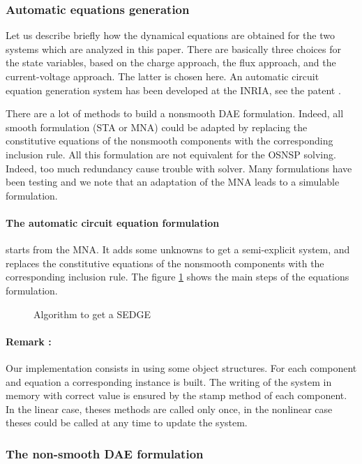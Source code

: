 \documentclass{article}
\begin{document}
\subsubsection{Automatic equations generation}

Let us describe briefly how the dynamical equations are obtained for the two systems which are analyzed in this paper. There are basically three choices for the state variables, based on the charge approach, the flux approach, and the current-voltage approach. The latter is chosen here. An automatic circuit equation generation system has been developed at the INRIA, see the patent \cite{}. 

There are a lot of methods to build a nonsmooth DAE formulation. Indeed, all smooth formulation 
(STA or MNA) could be adapted by replacing the constitutive equations of the nonsmooth components
with the corresponding inclusion rule. All this formulation are not equivalent for the OSNSP
solving. Indeed, too much redundancy cause trouble with solver. Many formulations have been testing
and we note that an adaptation of the MNA leads to a simulable formulation.

\paragraph{The automatic circuit equation formulation} starts from the MNA. It adds some unknowns to
get a semi-explicit system, and replaces the constitutive equations of the nonsmooth components with
the corresponding inclusion rule. The figure \ref{fig:acef_algo} shows the main steps of the
equations formulation.

\begin{figure}[h]
  \centering
  \scalebox{0.5}{
  
  }
  \caption{Algorithm to get a SEDGE}
  \label{fig:acef_algo}
\end{figure}

\paragraph{Remark :} Our implementation consists in using some object structures. For each component
and equation a corresponding instance is built. The writing of the system in memory with correct value is ensured by the stamp method of each component. In the linear
case, theses methods are called only once, in the nonlinear case theses could be called at any time to update the system.


\subsubsection{The non-smooth DAE formulation}
\end{document}
